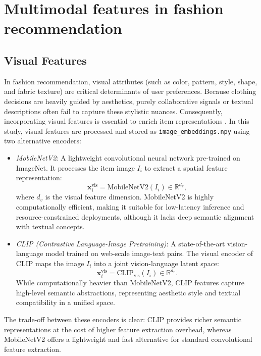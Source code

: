 \section{Multimodal features in fashion recommendation}

\subsection{Visual Features}

In fashion recommendation, visual attributes (such as color, pattern, style, shape, and fabric texture) are critical determinants of user preferences. Because clothing decisions are heavily guided by aesthetics, purely collaborative signals or textual descriptions often fail to capture these stylistic nuances. Consequently, incorporating visual features is essential to enrich item representations \parencite{10.1007/978-981-95-3355-8_6}. In this study, visual features are processed and stored as \texttt{image\_embeddings.npy} using two alternative encoders:
\begin{itemize}
    \item \textit{MobileNetV2}: A lightweight convolutional neural network pre-trained on ImageNet. It processes the item image \(I_i\) to extract a spatial feature representation:
    \begin{equation}
        \mathbf{x}_i^{\text{vis}} = \text{MobileNetV2}(I_i) \in \mathbb{R}^{d_v},
    \end{equation}
    where \(d_v\) is the visual feature dimension. MobileNetV2 is highly computationally efficient, making it suitable for low-latency inference and resource-constrained deployments, although it lacks deep semantic alignment with textual concepts.
    \item \textit{CLIP (Contrastive Language-Image Pretraining)}: A state-of-the-art vision-language model trained on web-scale image-text pairs. The visual encoder of CLIP maps the image \(I_i\) into a joint vision-language latent space:
    \begin{equation}
        \mathbf{x}_i^{\text{vis}} = \text{CLIP}_{\text{vis}}(I_i) \in \mathbb{R}^{d_v}.
    \end{equation}
    While computationally heavier than MobileNetV2, CLIP features capture high-level semantic abstractions, representing aesthetic style and textual compatibility in a unified space.
\end{itemize}
The trade-off between these encoders is clear: CLIP provides richer semantic representations at the cost of higher feature extraction overhead, whereas MobileNetV2 offers a lightweight and fast alternative for standard convolutional feature extraction.



